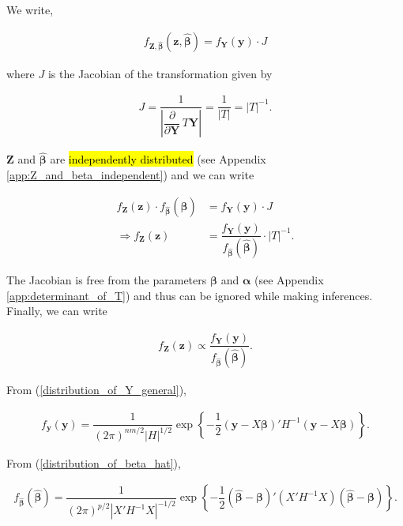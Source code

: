 \documentclass[11pt, a4paper]{article}
\newcommand{\bs}[1]{\boldsymbol{#1}}
\newcommand{\yhl}[1]{%
    {\sethlcolor{yellow}\hl{#1}}%
}
\begin{document}
We write,

\begin{align*}
f_{\bs{Z},\widehat{\bs{\beta}}}(\bs{z},\widehat{\bs{\beta}})
=
f_{\bs{Y}}(\bs{y}) \cdot J
\end{align*}

where $J$ is the Jacobian of the transformation given by

\begin{align*}
J
=
\dfrac{1}{
\left\lvert
\dfrac{\partial}{\partial \bs{Y}}\, T\bs{Y}
\right\rvert
}
= \dfrac{1}{\left\lvert T \right\rvert}
= \left\lvert T \right\rvert^{-1}.
\end{align*}

$\bs{Z}$ and $\widehat{\bs{\beta}}$ are \yhl{independently distributed} (see Appendix \ref{app:Z_and_beta_independent}) and we can write

\begin{align*}
f_{\bs{Z}}(\bs{z}) \cdot f_{\widehat{\bs{\beta}}}(\widehat{\bs{\beta}}) 
&= f_{\bs{Y}}(\bs{y}) \cdot J \\[1em]
\Rightarrow f_{\bs{Z}}(\bs{z})
&=
\dfrac{
f_{\bs{Y}}(\bs{y})
}{
f_{\widehat{\bs{\beta}}}(\widehat{\bs{\beta}})}
\cdot 
\left\lvert T \right\rvert^{-1}
.
\end{align*}

The Jacobian is free from the parameters $\bs{\beta}$ and $\bs{\alpha}$ (see Appendix \ref{app:determinant_of_T}) and thus can be ignored while making inferences. \\[0.5em]

Finally, we can write

\begin{align}\label{PDF_Z_form}
f_{\bs{Z}}(\bs{z})
\propto
\dfrac{
f_{\bs{Y}}(\bs{y})
}{
f_{\widehat{\bs{\beta}}}(\widehat{\bs{\beta}})
}.
\end{align}

From (\ref{distribution_of_Y_general}),

\begin{align}\label{PDF_Y_general}
f_{\bs{y}}(\bs{y})
=
\dfrac{
1
}{
(2\pi)^{nm/2}
\lvert H \rvert^{1/2}
}
\exp\!\left\{
-\dfrac{1}{2}
\left(
\bs{y} - X\bs{\beta}
\right)'
H^{-1}
\left(
\bs{y} - X\bs{\beta}
\right)
\right\}.
\end{align}

From (\ref{distribution_of_beta_hat}),

\begin{align}\label{PDF_beta_hat}
f_{\widehat{\bs{\beta}}}(\widehat{\bs{\beta}})
=
\dfrac{
1
}{
(2\pi)^{p/2}
\left\lvert
X'H^{-1}X
\right\rvert^{-1/2}
}
\exp\!\left\{
-\dfrac{1}{2}
\left(
\widehat{\bs{\beta}} - \bs{\beta}
\right)'
\left(
X'H^{-1}X
\right)
\left(
\widehat{\bs{\beta}} - \bs{\beta}
\right)
\right\}.
\end{align}
\end{document}
